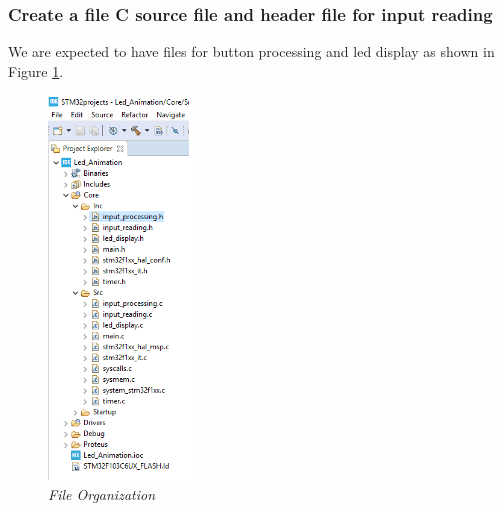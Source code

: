 

\subsubsection{Create a file C source file and header file for input reading}
We are expected to have files for button processing and led display as shown in Figure \ref{bai4_pic_Adding_new_files_to_project}.

\begin{figure}[!htp]
    \centering
    \includegraphics[width=1.5in]{source/picture/bai_3/Adding_new_files_to_project.png}
    \caption{\textit{File Organization}}
    \label{bai4_pic_Adding_new_files_to_project}
\end{figure}

